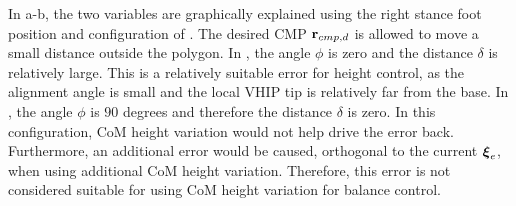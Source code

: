 In a-b, the two variables are graphically explained using the right stance foot position and configuration of . The desired \ac{CMP} $\mathbf{r}_{cmp,d}$ is allowed to move a small distance outside the polygon. In , the angle $\phi$ is zero and the distance $\delta$ is relatively large. This is a relatively suitable error for height control, as the alignment angle is small and the local \ac{VHIP} tip is relatively far from the base. In , the angle $\phi$ is $90$ degrees and therefore the distance $\delta$ is zero. In this configuration, \ac{CoM} height variation would not help drive the error back. Furthermore, an additional error would be caused, orthogonal to the current $\boldsymbol{\xi}_e$, when using additional \ac{CoM} height variation. Therefore, this error is not considered suitable for using \ac{CoM} height variation for balance control.

